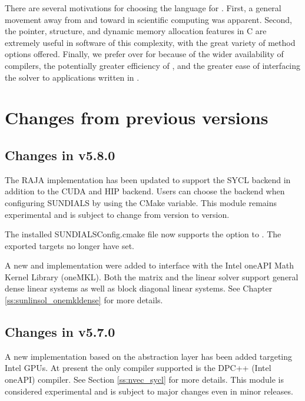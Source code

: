  There are
several motivations for choosing the {\CC} language for {\kinsol}.
First, a general movement away from {\F} and toward {\CC} in
scientific computing was apparent. Second, the pointer, structure,
and dynamic memory allocation features in C are extremely useful
in software of this complexity, with the great variety of method
options offered. Finally, we prefer {\CC} over {\CPP} for {\kinsol}
because of the wider availability of {\CC} compilers, the
potentially greater efficiency of {\CC}, and the greater ease of
interfacing the solver to applications written in {\F}.


\section{Changes from previous versions}

\subsection*{Changes in v5.8.0}

The RAJA {\nvector} implementation has been updated to support the SYCL backend
in addition to the CUDA and HIP backend. Users can choose the backend when
configuring SUNDIALS by using the  CMake variable.
This module remains experimental and is subject to change from version to
version.

The installed SUNDIALSConfig.cmake file now supports the  option
to . The exported targets no longer have  set.

A new {\sunmatrix} and {\sunlinsol} implementation were added to interface with
the Intel oneAPI Math Kernel Library (oneMKL). Both the matrix and the linear
solver support general dense linear systems as well as block diagonal linear
systems. See Chapter \ref{ss:sunlinsol_onemkldense} for more details.

\subsection*{Changes in v5.7.0}

A new {\nvector} implementation based on the {\sycl} abstraction layer has been
added targeting Intel GPUs. At present the only {\sycl} compiler supported is
the DPC++ (Intel oneAPI) compiler. See Section \ref{ss:nvec_sycl} for more
details. This module is considered experimental and is subject to major changes
even in minor releases.

